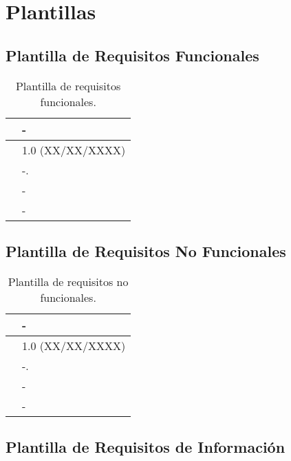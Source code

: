 \chapter{Plantillas}
\label{plantillas}

\section{Plantilla de Requisitos Funcionales}

\begin{table}[H]
\begin{center}
\begin{tabular}{|p{3cm}|p{10cm}|} \hline
\centering {\bf FRQ-XX} & -  \\ \hline\hline
\centering {\bf Versión} & 1.0 (XX/XX/XXXX) \\ \hline
\centering {\bf Descripción} &  -. \\ \hline
\centering {\bf Importancia} & - \\ \hline
\centering {\bf Urgencia} & - \\ \hline
\end{tabular}
\caption{Plantilla de requisitos funcionales.}
\label{enlaceFRQX}
\end{center}
\end{table}


\section{Plantilla de Requisitos No Funcionales}

\begin{table}[H]
\begin{center}
\begin{tabular}{|p{3cm}|p{10cm}|} \hline
\centering {\bf NFR-XX} & -  \\ \hline\hline
\centering {\bf Versión} & 1.0 (XX/XX/XXXX) \\ \hline
\centering {\bf Descripción} &  -. \\ \hline
\centering {\bf Importancia} & - \\ \hline
\centering {\bf Urgencia} & - \\ \hline
\end{tabular}
\caption{Plantilla de requisitos no funcionales.}
\label{enlaceNFRX}
\end{center}
\end{table}


\section{Plantilla de Requisitos de Información}

